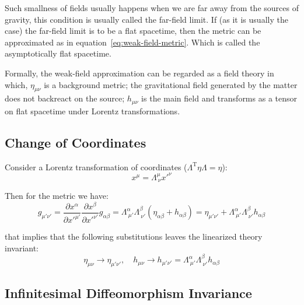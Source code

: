 Such smallness of fields usually happens when we are far away from the sources of gravity, this condition is usually called the far-field limit.
If (as it is usually the case) the far-field limit is to be a flat spacetime, then the metric can be approximated as in equation~\ref{eq:weak-field-metric}.
Which is called the asymptotically flat spacetime.

Formally, the weak-field approximation can be regarded as a field theory in which, $\eta_{\mu\nu}$ is a background metric; the gravitational field generated by the matter does not backreact on the source; $h_{\mu\nu}$ is the main field and transforms as a tensor on flat spacetime under Lorentz transformations.

\subsection{Change of Coordinates}\label{subsec:change-of-coordinates}

Consider a Lorentz transformation of coordinates ($\Lambda^{\text{T}}\eta\Lambda = \eta$):
\begin{equation}
    x^{\mu} = \Lambda^{\mu}_{\ \nu} x'^{\nu}\label{eq:coord-transformation-general-def}
\end{equation}

Then for the metric we have:
\begin{equation}
    g_{\mu'\nu'} = \frac{\partial x^{\alpha}}{\partial x'^{\mu'}} \frac{\partial x^{\beta}}{\partial x'^{\nu'}} g_{\alpha\beta} = \Lambda^{\alpha}_{\ \mu'} \Lambda^{\beta}_{\ \nu'} (\eta_{\alpha\beta} + h_{\alpha\beta}) = \eta_{\mu'\nu'} + \Lambda^{\alpha}_{\ \mu'} \Lambda^{\beta}_{\ \nu'} h_{\alpha\beta}\label{eq:metric-transformation-general-def}
\end{equation}

that implies that the following substitutions leaves the linearized theory invariant:
\begin{equation}
    \eta_{\mu\nu} \rightarrow \eta_{\mu'\nu'}, \quad h_{\mu\nu} \rightarrow h_{\mu'\nu'} = \Lambda^{\alpha}_{\ \mu'} \Lambda^{\beta}_{\ \nu'} h_{\alpha\beta}\label{eq:weak-field-metric-lorentz-invariance}
\end{equation}

\subsection{Infinitesimal Diffeomorphism Invariance}\label{subsec:infinitesimal-diffeomorphism-invariance}

